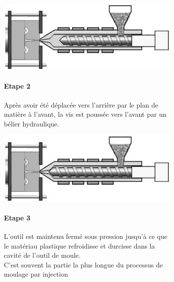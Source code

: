 \begin{figure}[!htbp]
    \centering
    \begin{subfigure}[m]{.55\linewidth}
        \centering
        \includegraphics[width=\textwidth]{assets/conception1/img98.jpg}
    \end{subfigure}
    \hfill
    \begin{subfigure}[m]{.4\linewidth}
       \paragraph*{Etape 2}
        Après avoir été déplacée vers l’arrière par le plan de matière à l’avant, la vis est poussée vers l’avant par un bélier hydraulique.
    \end{subfigure}
\end{figure}

\begin{figure}[!htbp]
    \centering
    \begin{subfigure}[m]{.55\linewidth}
        \centering
        \includegraphics[width=\textwidth]{assets/conception1/img110.jpg}
    \end{subfigure}
    \hfill
    \begin{subfigure}[m]{.4\linewidth}
       \paragraph*{Etape 3}
        L’outil est maintenu fermé sous pression jusqu’à ce que le matériau plastique refroidisse et durcisse dans la cavité de l’outil de moule. \\
        C’est souvent la partie la plus longue du processus de moulage par injection
    \end{subfigure}
\end{figure}

